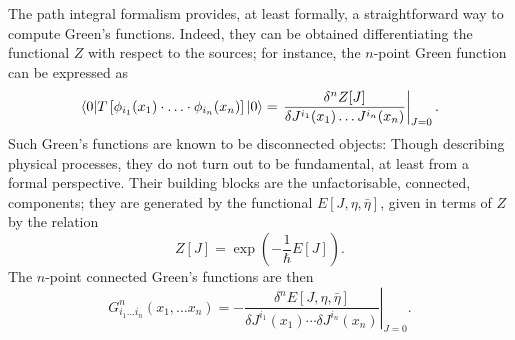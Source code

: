 The path integral formalism provides, at least formally, a straightforward way to compute Green's functions. Indeed, they can  be obtained differentiating the functional $Z$ with respect to the sources; for instance, the $n$-point Green function can be expressed as
\begin{equation}\label{pi-green-function}
\braket{ 0 | T\left[ \phi_{i_1}(x_1)\cdot \ldots\cdot \phi_{i_n} (x_n) \right]  | 0 }
	=
\left.
\frac{\delta^n Z[J] }{\delta J^{i_1}(x_1) \ldots J^{i_n}(x_n)}
\right|_{ J = 0 }.
\end{equation}
Such Green's functions are known to be disconnected objects: Though describing physical processes, they do not turn out to be fundamental, at least from a  formal perspective. Their building blocks are the unfactorisable, \ie connected, components; they are generated by the functional $E[J,\eta,\bar \eta]$, given in terms of $Z$ by the relation
\begin{equation}
Z[J] = \exp\left(-\frac{1}{\hbar}E[J]\right).
\end{equation}
The $n$-point connected Green's functions are then
\begin{equation}
G^n_{i_1 \ldots i_n}(x_1,\ldots x_n) 
	=
	-
\left. \frac{\delta^n E[J,\eta,\bar\eta] }{\delta J^{i_1}(x_1) \cdots \delta J^{i_n}(x_n)} \right|_{ J  = 0 }.
\end{equation}

